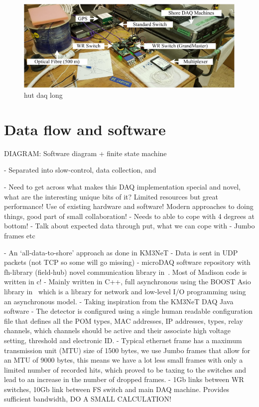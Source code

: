 \begin{figure} %
    \includegraphics[width=\textwidth]{diagrams/5-daq/hut_daq.pdf}
    \caption[hut daq short]
    {hut daq long}
    \label{fig:hut_daq}
\end{figure}

\section{Data flow and software} %
\label{sec:daq_soft} %

DIAGRAM: Software diagram + finite state machine

- Separated into slow-control, data collection, and

- Need to get across what makes this DAQ implementation special and novel, what are the
interesting unique bits of it? Limited resources but great performance! Use of existing hardware
and software! Modern approaches to doing things, good part of small collaboration!
- Needs to able to cope with 4 degrees at bottom!
- Talk about expected data through put, what we can cope with
- Jumbo frames etc

- An `all-data-to-shore' approach as done in KM3NeT
- Data is sent in UDP packets (not TCP so some will go missing)
- microDAQ software repository with fh-library (field-hub) novel communication library
in~\cite{microdaq2020}. Most of Madison code is written in c!
- Mainly written in C++, full asynchronous using the BOOST Asio library in~\cite{boost2020} which
is a library for network and low-level I/O programming using an asynchronous model.
- Taking inspiration from the KM3NeT DAQ Java software
- The detector is configured using a single human readable configuration file that defines all the
POM types, MAC addresses, IP addresses, types, relay channels, which channels should be active and
their associate high voltage setting, threshold and electronic ID.
- Typical ethernet frame has a maximum transmission unit (MTU) size of 1500 bytes, we use Jumbo
frames that allow for an MTU of 9000 bytes, this means we have a lot less small frames with only a
limited number of recorded hits, which proved to be taxing to the switches and lead to an increase
in the number of dropped frames.
- 1Gb links between WR switches, 10Gb link between FS switch and main DAQ machine. Provides
sufficient bandwidth, DO A SMALL CALCULATION!

